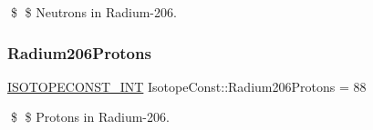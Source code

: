 \$ \$ Neutrons in Radium-\/206. \mbox{\label{group___isotope_const-_radium-_ra206_ga03c631f3f13703f58c584a911c178d74}} 
\subsubsection{\texorpdfstring{Radium206\+Protons}{Radium206Protons}}
{\footnotesize\ttfamily \mbox{\hyperlink{group___isotope_const-_macros_ga5f18360b3e99483a35c32d789e62621c}{I\+S\+O\+T\+O\+P\+E\+C\+O\+N\+S\+T\+\_\+\+I\+NT}} Isotope\+Const\+::\+Radium206\+Protons = 88}

\$ \$ Protons in Radium-\/206. 
